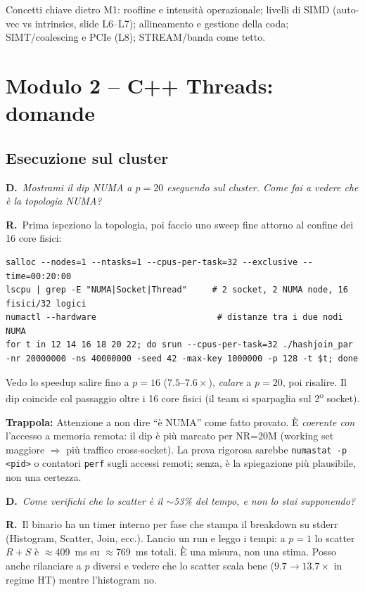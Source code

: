 \documentclass[11pt,a4paper]{article}
\newcommand{\D}[1]{\begin{dom}\small\textbf{D.}\ \itshape #1\end{dom}}
\newcommand{\R}{\noindent\textbf{R.}\ }
\newcommand{\Trap}{\par\smallskip\noindent\textbf{\textcolor{orange!80!black}{Trappola:}} }
\begin{document}
\begin{theorybox}
Concetti chiave dietro M1: roofline e intensità operazionale; livelli di SIMD (auto-vec vs intrinsics, slide L6--L7); allineamento e gestione della coda; SIMT/coalescing e PCIe (L8); STREAM/banda come tetto.
\end{theorybox}
\section{Modulo 2 -- C++ Threads: domande}

\subsection{Esecuzione sul cluster}

\D{Mostrami il dip NUMA a $p=20$ eseguendo sul cluster. Come fai a vedere che è la topologia NUMA?}
\R Prima ispeziono la topologia, poi faccio uno sweep fine attorno al confine dei 16 core fisici:
\begin{lstlisting}[style=bash]
salloc --nodes=1 --ntasks=1 --cpus-per-task=32 --exclusive --time=00:20:00
lscpu | grep -E "NUMA|Socket|Thread"     # 2 socket, 2 NUMA node, 16 fisici/32 logici
numactl --hardware                        # distanze tra i due nodi NUMA
for t in 12 14 16 18 20 22; do srun --cpus-per-task=32 ./hashjoin_par -nr 20000000 -ns 40000000 -seed 42 -max-key 1000000 -p 128 -t $t; done
\end{lstlisting}
Vedo lo speedup salire fino a $p=16$ ($7.5$--$7.6\times$), \emph{calare} a $p=20$, poi risalire. Il dip coincide col passaggio oltre i 16 core fisici (il team si sparpaglia sul 2\textsuperscript{o} socket).
\Trap Attenzione a non dire ``è NUMA'' come fatto provato. È \emph{coerente con} l'accesso a memoria remota: il dip è più marcato per NR=20M (working set maggiore $\Rightarrow$ più traffico cross-socket). La prova rigorosa sarebbe \texttt{numastat -p <pid>} o contatori \texttt{perf} sugli accessi remoti; senza, è la spiegazione più plausibile, non una certezza.

\D{Come verifichi che lo scatter è il $\sim$53\% del tempo, e non lo stai supponendo?}
\R Il binario ha un timer interno per fase che stampa il breakdown su stderr (Histogram, Scatter, Join, ecc.). Lancio un run e leggo i tempi: a $p=1$ lo scatter $R+S$ è $\approx$409~ms su $\approx$769~ms totali. È una misura, non una stima. Posso anche rilanciare a $p$ diversi e vedere che lo scatter scala bene ($9.7\to13.7\times$ in regime HT) mentre l'histogram no.
\end{document}
